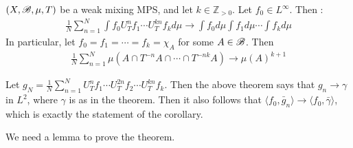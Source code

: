 \documentclass[12pt,a4paper]{report}
\newenvironment{proof}
{\begin{changemargin}{1cm}{0.5cm} 
	}%
	{\end{changemargin}
}
\begin{document}
\cor  $(X,\mathscr{B}, \mu, T)$ be a weak mixing MPS, and let $k\in \mathbb{Z}_{>0}$. Let $f_0 \in L^{\infty}$. Then :
\begin{align*}
\frac{1}{N} \sum_{n=1}^N \int f_0 U^n_T f_1 \cdots U^{kn}_T f_k d\mu \rightarrow \int f_0 d\mu \int f_1 d\mu \cdots \int f_k d\mu
\end{align*}
In particular, let $f_0 = f_1 = \cdots = f_k = \chi_A$ for some $A\in \mathscr{B}$. Then
\begin{align*}
\frac{1}{N}\sum_{n=1}^N \mu(A \cap T^{-n}A \cap \cdots \cap T^{-nk} A) \rightarrow \mu(A)^{k+1}
\end{align*}
\begin{proof}
\pf Let $g_N = \frac{1}{N} \sum_{n=1}^N U^n_T f_1 \cdots U^{2n}_T f_2 \cdots U^{kn}_T f_k$. Then the above theorem says that $g_n \rightarrow \gamma$ in $L^2$, where $\gamma$ is as in the theorem. Then it also follows that $\langle f_0, \bar{g}_n \rangle \rightarrow \langle f_0 , \bar{\gamma}\rangle$, which is exactly the statement of the corollary.

\eop
\end{proof}
\s

We need a lemma to prove the theorem.
\s
\end{document}
